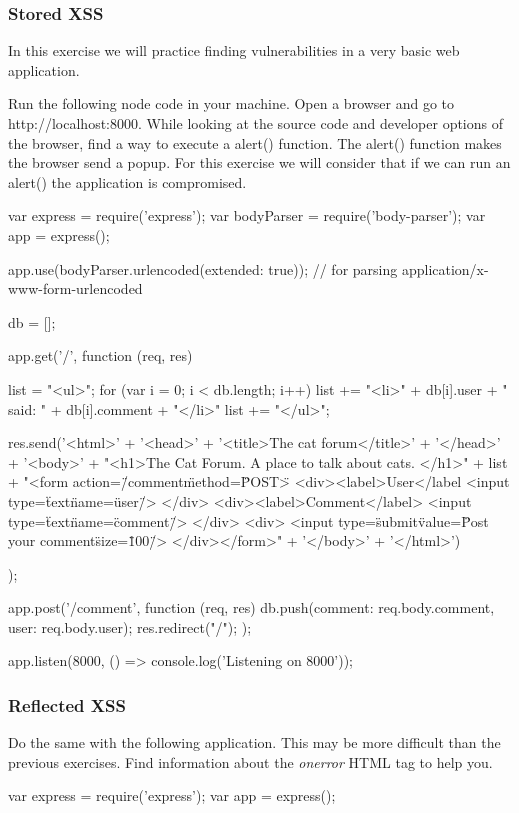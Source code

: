 
\begin{Exercise}[label={websec-xss-types}]
\subsubsection{Stored XSS}
In this exercise we will practice finding vulnerabilities in a very basic web application.

Run the following node code in your machine. Open a browser and go to http://localhost:8000. While looking at the source code and developer options of the browser, find a way to execute a alert() function. The alert() function makes the browser send a popup. For this exercise we will consider that if we can run an alert() the application is compromised.

\begin{js}
var express = require('express');
var bodyParser = require('body-parser');
var app = express();

app.use(bodyParser.urlencoded({extended: true})); // for parsing application/x-www-form-urlencoded

db = [];

app.get('/', function (req, res) {
list = "<ul>";
for (var i = 0; i < db.length; i++) {
  list += "<li>" + db[i].user + " said: " + db[i].comment + "</li>"
  }
list += "</ul>";

res.send('<html>' +
  '<head>' +
  '<title>The cat forum</title>' +
  '</head>' +
  '<body>' +
  "<h1>The Cat Forum. A place to talk about cats. </h1>" +
  list +
  "<form action=\"/comment\" method=\"POST\">
  <div><label>User</label
    <input type=\"text\" name=\"user\"/>
  </div>
  <div><label>Comment</label>
    <input type=\"text\" name=\"comment\"/>
  </div>
  <div>
    <input type=\"submit\" value=\"Post your comment\"size=\"100\"/>
  </div></form>" +
  '</body>' +
  '</html>')
});

app.post('/comment', function (req, res) {
  db.push({comment: req.body.comment, user: req.body.user});
  res.redirect("/");
});

app.listen(8000, () => console.log('Listening on 8000'));
\end{js}

\subsubsection{Reflected XSS}
Do the same with the following application. This may be more difficult than the previous exercises. Find information about the \textit{onerror} HTML tag to help you.
\begin{js}
var express = require('express');
var app = express();


\end{js}
\end{Exercise}
